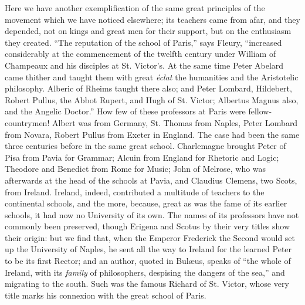 Here we have another
exemplification of the same great principles of the movement which we
have noticed elsewhere; its teachers came from afar, and they
depended, not on kings and great men for their support, but on the
enthusiasm they created. ``The reputation of the school of Paris,''
says Fleury, ``increased considerably at the commencement of the
twelfth century under William of Champeaux and his disciples at St.
Victor's. At the same time Peter Abelard came thither and taught them
with great \emph{éclat} the humanities and the Aristotelic
philosophy. Alberic of Rheims taught there also; and Peter Lombard,
Hildebert, Robert Pullus, the Abbot Rupert, and Hugh of St. Victor;
Albertus Magnus also, and the Angelic Doctor.'' How few of these
professors at Paris were fellow-countrymen! Albert was from Germany,
St. Thomas from Naples, Peter Lombard from Novara, Robert Pullus from
Exeter in England. The case had been the same three centuries before
in the same great school. Charlemagne brought Peter of Pisa from Pavia
for Grammar; Alcuin from England for Rhetoric and Logic; Theodore and
Benedict from Rome for Music; John of Melrose, who was afterwards at the head of the schools at Pavia, and Claudius Clemens,
two Scots, from Ireland. Ireland, indeed, contributed a multitude of
teachers to the continental schools, and the more, because, great as
was the fame of its earlier schools, it had now no University of its
own. The names of its professors have not commonly been preserved,
though Erigena and Scotus by their very titles show their origin: but
we find that, when the Emperor Frederick the Second would set up the
University of Naples, he sent all the way to Ireland for the learned
Peter to be its first Rector; and an author, quoted in Bulæus, speaks
of ``the whole of Ireland, with its \emph{family} of philosophers,
despising the dangers of the sea,'' and migrating to the south. Such
was the famous Richard of St. Victor, whose very title marks his
connexion with the great school of Paris.

